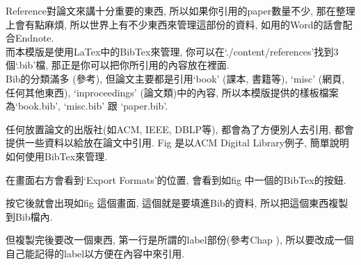 

Reference對論文來講十分重要的東西, 所以如果你引用的paper數量不少, 那在整理上會有點麻煩, 所以世界上有不少東西來管理這部份的資料, 如用的Word的話會配合Endnote.\\

而本模版是使用LaTex中的BibTex來管理, 你可以在`./content/references'找到3個`.bib'檔, 那正是你可以把你所引用的內容放在裡面.\\

Bib的分類滿多 (參考), 但論文主要都是引用`book' (課本, 書籍等), `misc' (網頁, 任何其他東西), `inproceedings' (論文類)中的內容, 所以本模版提供的樣板檔案為`book.bib', `misc.bib' 跟 `paper.bib'.


任何放置論文的出版社(如ACM, IEEE, DBLP等), 都會為了方便別人去引用, 都會提供一些資料以給放在論文中引用. Fig  是以ACM Digital Library例子, 簡單說明如何使用BibTex來管理.



在畫面右方會看到`Export Formats'的位置, 會看到如fig 中一個的BibTex的按鈕.


按它後就會出現如fig 這個畫面, 這個就是要填進Bib的資料, 所以把這個東西複製到Bib檔內.


但複製完後要改一個東西, 第一行是所謂的label部份(參考Chap ), 所以要改成一個自己能記得的label以方便在內容中來引用.


\EndChapter
